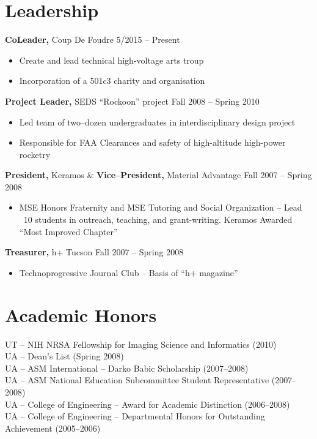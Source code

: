 \documentclass{res}
\begin{document}
\begin{resume}
\section{Leadership}

{\bf CoLeader,}  Coup De Foudre \hfill   5/2015 -- Present
\begin{itemize} \itemsep -2pt
\item Create and lead technical high-voltage arts troup
\item Incorporation of a 501c3 charity and organisation
\end{itemize}

{\bf Project Leader,}  SEDS ``Rockoon''  project \hfill   Fall 2008 -- Spring 2010
\begin{itemize} \itemsep -2pt
\item Led team of two--dozen undergraduates in interdisciplinary design project
\item Responsible for FAA Clearances and safety of high-altitude high-power rocketry
\end{itemize}

{\bf President,} Keramos \& {\bf Vice--President,} Material Advantage  \hfill  Fall 2007 -- Spring 2008

\begin{itemize} \itemsep -2pt
\item MSE Honors Fraternity and MSE Tutoring and Social Organization -- Lead ~10 students in outreach,
  teaching, and grant-writing. Keramos Awarded ``Most Improved Chapter''
\end{itemize}

{\bf Treasurer,} h+ Tucson \hfill Fall 2007 -- Spring 2008
\begin{itemize} \itemsep -2pt
\item Technoprogressive Journal Club -- Basis of ``h+ magazine''
\end{itemize}

\section{Academic Honors}
UT -- NIH NRSA Fellowship for Imaging Science and Informatics (2010)\\
UA -- Dean’s List (Spring 2008) \\
UA -- ASM International -- Darko Babic Scholarship (2007--2008) \\
UA -- ASM National Education Subcommittee Student Representative (2007--2008) \\
UA -- College of Engineering -- Award for Academic Distinction (2006--2008) \\
UA -- College of Engineering -- Departmental Honors for Outstanding Achievement (2005--2006)


\end{resume}
\end{document}
